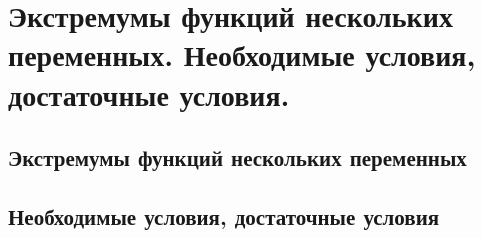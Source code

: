 \chapter{Экстремумы функций нескольких переменных. Необходимые условия, достаточные условия.}
\section{Экстремумы функций нескольких переменных}
\section{Необходимые условия, достаточные условия}